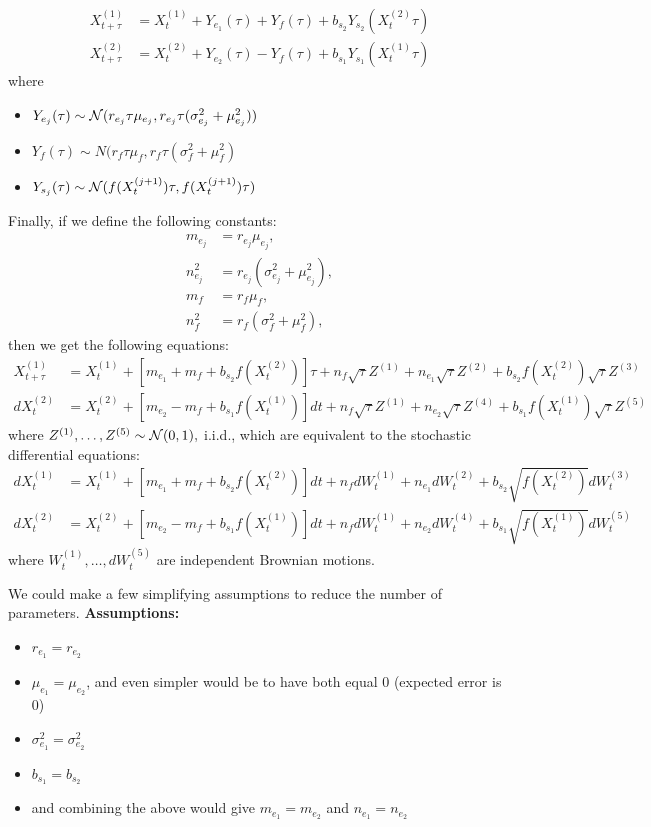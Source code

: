 \documentclass{article}
\begin{document}
\begin{align*}
X_{t+\tau}^{(1)}&=X_t^{(1)}+Y_{e_1}(\tau)+Y_f(\tau)+b_{s_2}Y_{s_2}(X_t^{(2)}\tau)
\\ X_{t+\tau}^{(2)}&=X_t^{(2)}+Y_{e_2}(\tau)-Y_f(\tau)+b_{s_1}Y_{s_1}(X_t^{(1)}\tau)
\end{align*}
where 
\begin{itemize}
\item $Y_{e_j}(\tau)\sim{\mathcal{ N}}(r_{e_j}\tau\mu_{e_j},r_{e_j}\tau(\sigma_{e_j}^2+\mu_{e_j}^2))$

\item $Y_f(\tau)\sim N(r_f\tau\mu_f,r_f\tau(\sigma^2_f+\mu_f^2)$

\item $Y_{s_j}(\tau)\sim{\mathcal{ N}}(f(X_t^{(j+1)})\tau,f(X_t^{(j+1)})\tau)$

\end{itemize}
Finally, if we define the following constants:
\begin{align*}
m_{e_j}&=r_{e_j}\mu_{e_j},
\\ n_{e_j}^2&=r_{e_j}(\sigma_{e_j}^2+\mu_{e_j}^2),
\\ m_f&=r_f\mu_f,
\\ n_f^2&=r_f(\sigma_f^2+\mu_f^2),
\end{align*}
then we get the following equations:
\begin{align*}
X_{t+\tau}^{(1)}&=X_t^{(1)}+\left[m_{e_1}+m_f+b_{s_2}f(X_t^{(2)})\right]\tau+n_f\sqrt{\tau}Z^{(1)}+n_{e_1}\sqrt{\tau}Z^{(2)}+b_{s_2}f(X_t^{(2)})\sqrt{\tau}Z^{(3)}
\\ dX_t^{(2)}&=X_t^{(2)}+\left[m_{e_2}-m_f+b_{s_1}f(X_t^{(1)})\right]dt+n_f\sqrt{\tau}Z^{(1)}+n_{e_2}\sqrt{\tau}Z^{(4)}+b_{s_1}f(X_t^{(1)})\sqrt{\tau}Z^{(5)}
\end{align*}
where $Z^{(1)},\dots,Z^{(5)}\sim {\mathcal{ N}}(0,1),$ i.i.d., which are equivalent to the stochastic differential equations:
\begin{align*}
dX_t^{(1)}&=X_t^{(1)}+\left[m_{e_1}+m_f+b_{s_2}f(X_t^{(2)})\right]dt+n_fdW_t^{(1)}+n_{e_1}dW_t^{(2)}+b_{s_2}\sqrt{f(X_t^{(2)})}dW_t^{(3)}
\\ dX_t^{(2)}&=X_t^{(2)}+\left[m_{e_2}-m_f+b_{s_1}f(X_t^{(1)})\right]dt+n_fdW_t^{(1)}+n_{e_2}dW_t^{(4)}+b_{s_1}\sqrt{f(X_t^{(1)})}dW_t^{(5)}
\end{align*}
where $W_t^{(1)},\dots,dW_t^{(5)}$ are independent Brownian motions.

We could make a few simplifying assumptions to reduce the number of parameters.  {\bf Assumptions:}
\begin{itemize}
\item $r_{e_1}=r_{e_2}$
\item $\mu_{e_1}=\mu_{e_2}$, and even simpler would be to have both equal $0$ (expected error is $0$)
\item $\sigma^2_{e_1}=\sigma^2_{e_2}$
\item $b_{s_1}=b_{s_2}$ 
\item and combining the above would give $m_{e_1}=m_{e_2}$ and $n_{e_1}=n_{e_2}$
\end{itemize}
\end{document}
